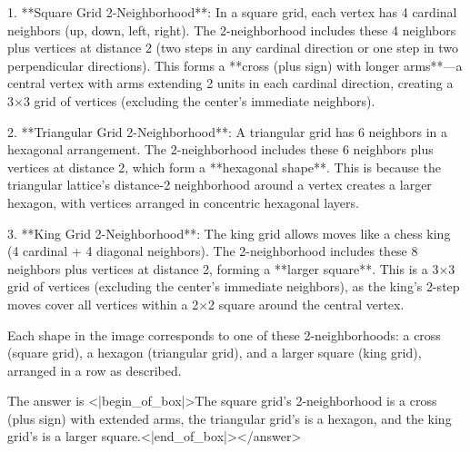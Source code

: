 1. **Square Grid 2-Neighborhood**:  
   In a square grid, each vertex has 4 cardinal neighbors (up, down, left, right). The 2-neighborhood includes these 4 neighbors plus vertices at distance 2 (two steps in any cardinal direction or one step in two perpendicular directions). This forms a **cross (plus sign) with longer arms**—a central vertex with arms extending 2 units in each cardinal direction, creating a 3×3 grid of vertices (excluding the center’s immediate neighbors).  

2. **Triangular Grid 2-Neighborhood**:  
   A triangular grid has 6 neighbors in a hexagonal arrangement. The 2-neighborhood includes these 6 neighbors plus vertices at distance 2, which form a **hexagonal shape**. This is because the triangular lattice’s distance-2 neighborhood around a vertex creates a larger hexagon, with vertices arranged in concentric hexagonal layers.  

3. **King Grid 2-Neighborhood**:  
   The king grid allows moves like a chess king (4 cardinal + 4 diagonal neighbors). The 2-neighborhood includes these 8 neighbors plus vertices at distance 2, forming a **larger square**. This is a 3×3 grid of vertices (excluding the center’s immediate neighbors), as the king’s 2-step moves cover all vertices within a 2×2 square around the central vertex.    

Each shape in the image corresponds to one of these 2-neighborhoods: a cross (square grid), a hexagon (triangular grid), and a larger square (king grid), arranged in a row as described.  

The answer is <|begin_of_box|>The square grid’s 2-neighborhood is a cross (plus sign) with extended arms, the triangular grid’s is a hexagon, and the king grid’s is a larger square.<|end_of_box|></answer>